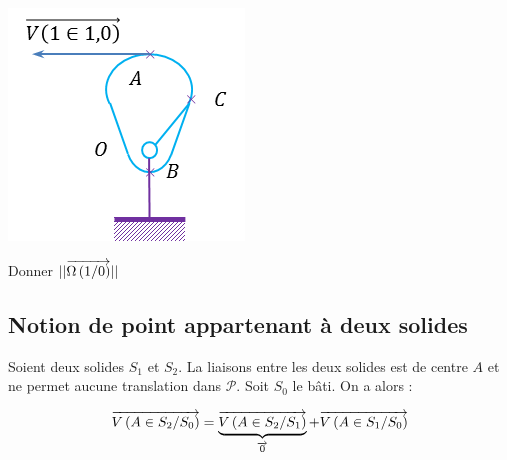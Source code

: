 \documentclass[10pt]{article}
\begin{document}
\begin{exemple}
\begin{minipage}[c]{.3\linewidth}
\begin{center}
\includegraphics[width=\textwidth]{images/came}
\end{center}
\end{minipage}\hfill
\begin{minipage}[c]{.3\linewidth}
\begin{center}
Donner $||\overrightarrow{\Omega\left( {1}/{0}\right)}||$
\end{center}
\end{minipage}


\end{exemple}


\subsection{Notion de point appartenant à deux solides}
\begin{resultat}
Soient deux solides $S_1$ et $S_2$. La liaisons entre les deux solides est de centre $A$ et ne permet aucune translation dans $\mathcal{P}$. Soit $S_0$ le bâti.
On a alors :

$$
\overrightarrow{V\left( {A} \in {S_2}/{S_0}\right)} =\underbrace{\overrightarrow{V\left( {A} \in {S_2}/{S_1}\right)}}_{\overrightarrow{0}} + \overrightarrow{V\left( {A} \in {S_1}/{S_0}\right)}
$$

\end{resultat}
\end{document}
